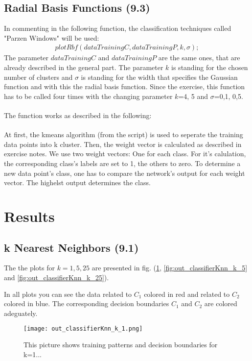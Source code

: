 \documentclass[a4paper,headings=small]{scrartcl}
\begin{document}
\subsection{Radial Basis Functions (9.3)}
In commenting in the following function, the classification techniques called "Parzen Windows" will be used:\\
\begin{align}
plotRbf(dataTrainingC, dataTrainingP, k, \sigma);
\end{align}
The parameter $dataTrainingC$ and $dataTrainingP$ are the same ones, that are already described in the general part. The parameter $k$ is standing for the chosen number of clusters and $\sigma$ is standing for the width that specifies the Gaussian function and with this the radial basis function.
Since the exercise, this function has to be called four times with the changing parameter $k$=4, 5 and $\sigma$=0,1, 0,5.\\
\\
The function works as described in the following:\\
\\
At first, the kmeans algorithm (from the script) is used to seperate the training data points into k cluster. Then, the weight vector is calculated as described in exercise notes. We use two weight vectors: One for each class. For it's calulation, the corresponding class's labels are set to 1, the others to zero. To determine a new data point's class, one has to compare the network's output for each weight vector. The highelst output determines the class.

\section{Results}

\subsection{k Nearest Neighbors (9.1)}
The the plots for $k = 1, 5, 25$ are presented in fig. (\ref{fig:out_classifierKnn_k_1},
\ref{fig:out_classifierKnn_k_5} and \ref{fig:out_classifierKnn_k_25}).

In all plots you can see the data related to $C_1$ colored in red and related to $C_2$ colored in blue.
The corresponding decision boundaries $C_1$ and $C_2$ are colored adeguately.

\begin{figure}[htbp]
\centering
\texttt{[image: out\_classifierKnn\_k\_1.png]}
\caption{This picture shows training patterns and decision boundaries for k=1...}
\label{fig:out_classifierKnn_k_1}
\end{figure}
\end{document}
